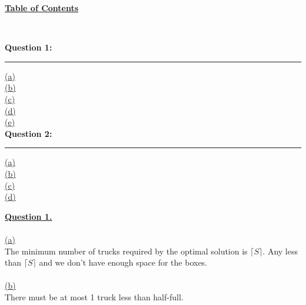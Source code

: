 \documentclass[12pt]{article}
\begin{document}
\begin{center}
	\hypertarget{toc}{\LARGE \underline{\textbf{Table of Contents}}}\\
\end{center}

{\textbf{Question 1:}}
\vspace{1mm}
\hrule
\vspace{1mm}
\hyperlink{1.1}{(a)}\\
\hyperlink{1.2}{(b)}\\
\hyperlink{1.3}{(c)}\\
\hyperlink{1.4}{(d)}\\
\hyperlink{1.5}{(e)}\\

{\textbf{Question 2:}}
\vspace{1mm}
\hrule
\vspace{1mm}
\hyperlink{2.1}{(a)}\\
\hyperlink{2.2}{(b)}\\
\hyperlink{2.3}{(c)}\\
\hyperlink{2.4}{(d)}\\

\newpage

\hyperlink{toc}{\hypertarget{1}{\LARGE \underline{\textbf{Question 1.}}}}\\
~\\\hyperlink{toc}{\hypertarget{1.1}{(a)}}\\
The minimum number of trucks required by the optimal solution is $\lceil S \rceil$. Any less than $\lceil S \rceil$ and
we don't have enough space for the boxes.\\


~\\\hyperlink{toc}{\hypertarget{1.2}{(b)}}\\
There must be at most 1 truck less than half-full. \\
\end{document}
